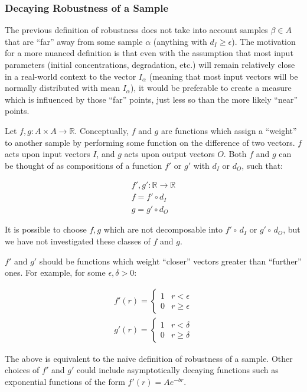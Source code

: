 \documentclass{article}
\begin{document}
\subsubsection{Decaying Robustness of a Sample}
The previous definition of robustness does not take into account samples $\beta \in A$ that are ``far'' away from some sample $\alpha$ (anything with $d_I \ge \epsilon$). The motivation for a more nuanced definition is that even with the assumption that most input parameters (initial concentrations, degradation, etc.) will remain relatively close in a real-world context to the vector $I_\alpha$ (meaning that most input vectors will be normally distributed with mean $I_\alpha$), it would be preferable to create a measure which is influenced by those ``far'' points, just less so than the more likely ``near'' points.

Let $f,g : A \times A \to \mathbb{R}$. Conceptually, $f$ and $g$ are functions which assign a ``weight'' to another sample by performing some function on the difference of two vectors. $f$ acts upon input vectors $I$, and $g$ acts upon output vectors $O$. Both $f$ and $g$ can be thought of as compositions of a function $f'$ or $g'$ with $d_I$ or $d_O$, such that:

\begin{align}
  f', g' : \mathbb{R} \to \mathbb{R} \\
  f = f' \circ d_I \\
  g = g' \circ d_O
\end{align}

It is possible to choose $f, g$ which are not decomposable into $f' \circ\, d_I$ or $g' \circ\, d_O$, but we have not investigated these classes of $f$ and $g$.

$f'$ and $g'$ should be functions which weight ``closer'' vectors greater than ``further'' ones. For example, for some $\epsilon, \delta > 0$:

\begin{align}
  f'(r) =
  \begin{cases}
    1 & r < \epsilon \\
    0 & r \ge \epsilon
  \end{cases} \\
  g'(r) =
  \begin{cases}
    1 & r < \delta \\
    0 & r \ge \delta
  \end{cases}
\end{align}

The above is equivalent to the na\"ive definition of robustness of a sample. Other choices of $f'$ and $g'$ could include asymptotically decaying functions such as exponential functions of the form $f'(r) = A e^{- b r}$.
\end{document}
